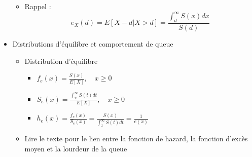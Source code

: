 \begin{itemize}
\begin{itemize}
		\item Rappel : 
		$$e_X(d) = E[X-d\vert X>d] = \frac{\int_{d}^{\infty}S(x) dx}{S(d)}$$ 
	\end{itemize}
	\item Distributions d'équilibre et comportement de queue
	\begin{itemize}
		\item Distribution d'équilibre
		\begin{itemize}
			\item $\displaystyle f_e(x) = \frac{S(x)}{E[X]}, \quad x\geq 0$
			\item $\displaystyle S_e(x) = \frac{\int_{x}^{\infty}S(t) dt}{E[X]}, \quad x\geq 0$
			\item $\displaystyle h_e(x) = \frac{f_e(x)}{S_e(x)} = \frac{S(x)}{\int_{x}^{\infty}S(t) dt} = \frac{1}{e(x)}$
		\end{itemize}
	\item Lire le texte pour le lien entre la fonction de hazard, la fonction d'excès moyen et la lourdeur de la queue
	\end{itemize}
\end{itemize}